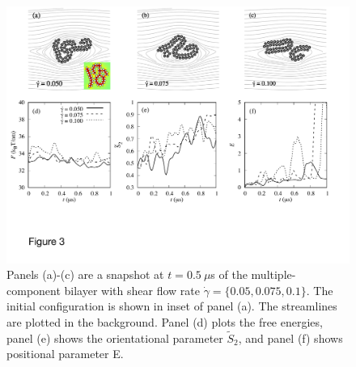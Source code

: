 \documentclass[aps,prl,preprint,groupedaddress]{revtex4-2}
\begin{document}
\begin{figure}
  \begin{center}
   \includegraphics[width=1.0\textwidth]{Figures/Figure3.pdf}
  \end{center}
  \caption{
    \label{fig:BC1_shear}
    Panels (a)-(c) are a snapshot at $t=0.5\ \mu$s of the multiple-component bilayer
    with shear flow rate $\dot \gamma = \{0.05, 0.075, 0.1\}$.
    The initial configuration is shown in inset of panel (a).
    The streamlines are plotted in the background.
    Panel (d) plots the free energies,
    panel (e) shows the orientational parameter $\tilde{S}_2$,
    and panel (f) shows positional parameter E.
}
\end{figure}
\end{document}
